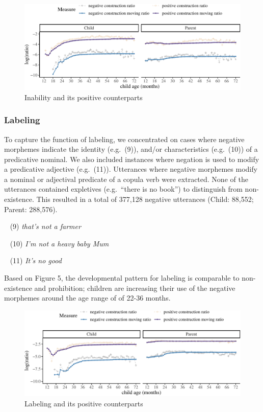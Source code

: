\documentclass[
  english,
  man,floatsintext]{apa6}
\begin{document}
\begin{figure}[H]

{\centering \includegraphics{neg_construction_article_files/figure-latex/inability-1} 

}

\caption{Inability and its positive counterparts}\label{fig:inability}
\end{figure}

\clearpage

\hypertarget{labeling}{%
\subsubsection{Labeling}\label{labeling}}

To capture the function of labeling, we concentrated on cases where negative morphemes indicate the identity (e.g.~(9)), and/or characteristics (e.g.~(10)) of a predicative nominal. We also included instances where negation is used to modify a predicative adjective (e.g.~(11)). Utterances where negative morphemes modify a nominal or adjectival predicate of a copula verb were extracted. None of the utterances contained expletives (e.g.~\enquote{there is no book}) to distinguish from non-existence. This resulted in a total of 377,128 negative utterances (Child: 88,552; Parent: 288,576).

~
(9) \emph{that's not a farmer}

~
(10) \emph{I'm not a heavy baby Mum}

~
(11) \emph{It's no good}

Based on Figure 5, the developmental pattern for labeling is comparable to non-existence and prohibition; children are increasing their use of the negative morphemes around the age range of of 22-36 months.

\begin{figure}[H]

{\centering \includegraphics{neg_construction_article_files/figure-latex/learning-1} 

}

\caption{Labeling and its positive counterparts}\label{fig:learning}
\end{figure}
\end{document}
